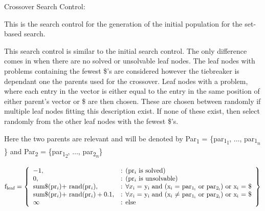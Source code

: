 \documentclass[11pt, oneside]{article}   	%
\newenvironment{cmr}{\fontfamily{cmr}\selectfont}{\par}
\begin{document}
\begin{comment}
\begin{cmr}
\noindent After f\textsubscript{leaf} values have been calculated for each node, if there is a solved node then the search is finished and the solved problem instance is returned as output.

\noindent Otherwise, all unsolvable nodes will be pruned, and a random integer, $r$, will be generated such that $1 \le r \le n$, where n is equal to the number of remaining new successor nodes generated by Altern.
Control will then select the $r$\textsuperscript{th} node and resume the expansion of O\textsubscript{Tree}.
\end{cmr}
\end{comment}
\begin{cmr}
\noindent Crossover Search Control:

\noindent This is the search control for the generation of the initial population for the set-based search.

\noindent This search control is similar to the initial search control. The only difference comes in when there are no solved or unsolvable leaf nodes. The leaf nodes with problems containing the fewest \$'s are considered however the tiebreaker is dependant one the parents used for the crossover. Leaf nodes with a problem, where each entry in the vector is either equal to the entry in the same position of either parent's vector or \$ are then chosen. These are chosen between randomly if multiple leaf nodes fitting this description exist. If none of these exist, then select randomly from the other leaf nodes with the fewest \$'s.

Here the two parents are relevant and will be denoted by Par\textsubscript{1} = \{par\textsubscript{1\textsubscript{1}}, $\dots$, par\textsubscript{1\textsubscript{$n$}}\} and Par\textsubscript{2} = \{par\textsubscript{1\textsubscript{2}}, $\dots$, par\textsubscript{2\textsubscript{$n$}}\}

    \[
        \text{f\textsubscript{leaf}} = \left\{\begin{array}{ll}
            -1, & \text{: (pr\textsubscript{$i$} is solved)}\\
            0, & \text{: (pr\textsubscript{$i$} is unsolvable)}\\
            \text{sum$\$$(pr\textsubscript{$i$})+ rand(pr\textsubscript{$i$})}, & \text{: $\forall x\textsubscript{i}$ = y\textsubscript{i} and (x\textsubscript{i} = par\textsubscript{1\textsubscript{i}} or par\textsubscript{2\textsubscript{i}}) or x\textsubscript{i} = \$}\\
            \text{sum$\$$(pr\textsubscript{$i$})+ rand(pr\textsubscript{$i$})} + 0.1, & \text{: $\forall x\textsubscript{i}$ = y\textsubscript{i} and (x\textsubscript{i} $\neq$ par\textsubscript{1\textsubscript{i}} or par\textsubscript{2\textsubscript{i}}) or x\textsubscript{i} = \$}\\
	\infty & \text{: else}
            \end{array}\right\}
      \]

\end{cmr}
\end{document}
